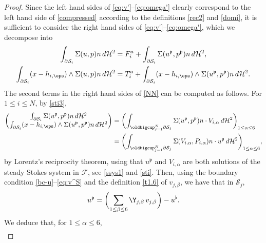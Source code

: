 \begin{proof}
Since the left hand sides of \eqref{eq:v'}--\eqref{eq:omega'} clearly correspond to
the left hand side of \eqref{compressed} according to the definitions \eqref{rec2} and \eqref{domi}, it is sufficient to
consider the right hand sides of \eqref{eq:v'}--\eqref{eq:omega'}, which we decompose into
\begin{subequations}
\label{NN}
\begin{align}
\int_{\partial \mathcal S_i } \Sigma(u,p) n \, d\mathcal{H}^2
&= F_i^a +\int_{\partial \mathcal S_i } \Sigma (u^\mathfrak{p}, p^\mathfrak{p}) n \, d\mathcal{H}^2, \\
\int_{\partial \mathcal S_i} (x - h_{i,\eps}) \wedge \Sigma(u,p) n \, d\mathcal{H}^2
&= T_i^a +
\int_{\partial \mathcal S_i} (x - h_{i,\eps}) \wedge \Sigma (u^\mathfrak{p}, p^\mathfrak{p}) n \, d\mathcal{H}^2.
\end{align}
\end{subequations}
The second terms in the right hand sides of \eqref{NN} can be computed as follows.
For $1 \leq i \leq N$, by \eqref{sti3},
\begin{align*}
\begin{pmatrix}
\int_{\partial \mathcal S_i } \Sigma(u^\mathfrak{p}, p^\mathfrak{p}) n \, d\mathcal{H}^2 \\
\int_{\partial \mathcal S_i} (x - h_{i,\eps}) \wedge \Sigma(u^\mathfrak{p}, p^\mathfrak{p}) n \, d\mathcal{H}^2
\end{pmatrix}
&=
\biggl(
\int_{\oldbigcup_{j=1}^N \partial \mathcal S_j }
\Sigma(u^\mathfrak{p}, p^\mathfrak{p}) n \cdot V_{i,\alpha} \, d\mathcal{H}^2
\biggr)_{1 \leq \alpha \leq 6}
\\ &=
\biggl(
\int_{\oldbigcup_{j=1}^N \partial \mathcal S_j } \Sigma(V_{i,\alpha}, P_{i,\alpha}) n \cdot u^\mathfrak{p} \, d\mathcal{H}^2
\biggr)_{1 \leq \alpha \leq 6},
\end{align*}
by Lorentz's reciprocity theorem, using that $u^\mathfrak{p}$ and $V_{i,\alpha}$ are both solutions of the steady Stokes system in $ \mathcal F$, see \eqref{ssys1} and \eqref{sti}.
Then, using the boundary condition \eqref{bc-u}--\eqref{eq:v^S} and the definition \eqref{t1.6} of $v_{j,\beta}$, we have that in $ \mathcal{S}_j$,
\begin{equation} \label{rec1}
u^\mathfrak{p} = \biggl(\sum_{1\leq \beta \leq 6} \Y_{j,\beta }\, v_{j,\beta}\biggr) - u^\flat.
\end{equation}
We deduce that, for $1 \leq \alpha \leq 6$,
\begin{multline*}

\end{multline*}
\end{proof}
